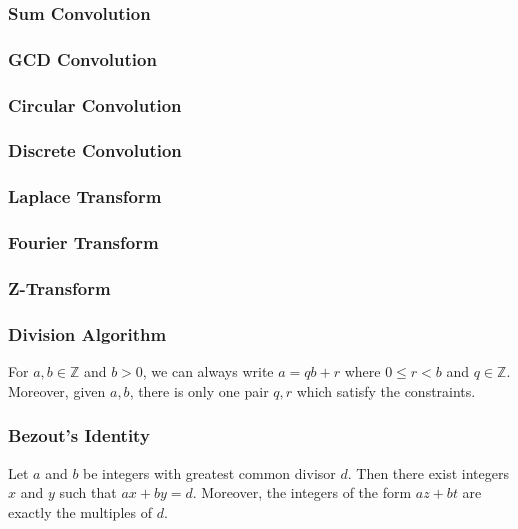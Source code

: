 \documentclass[12pt]{extarticle}
\begin{document}
\subsubsection*{Sum Convolution}
\subsubsection*{GCD Convolution}
\subsubsection*{Circular Convolution}
\subsubsection*{Discrete Convolution}
\subsubsection*{Laplace Transform}
\subsubsection*{Fourier Transform}
\subsubsection*{Z-Transform}



\subsubsection*{Division Algorithm}
For $a,b\in\mathbb{Z}$ and $b>0$, we can always write $a=qb+r$ where $0\leq r<b$ and $q\in\mathbb{Z}$. Moreover, given $a,b$, there is only one pair $q,r$ which satisfy the constraints.
\subsubsection*{Bezout's Identity}
Let $a$ and $b$ be integers with greatest common divisor $d$. Then there exist integers $x$ and $y$ such that $ax + by = d$. Moreover, the integers of the form $az + bt$ are exactly the multiples of $d$.
\end{document}
